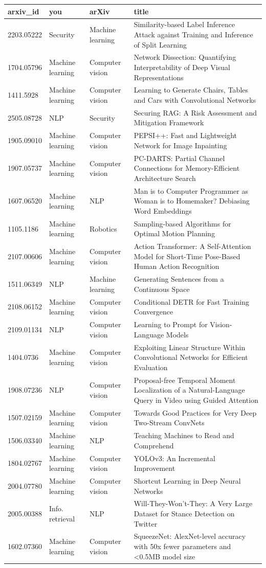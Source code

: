 \begin{tabular}{llll}
\toprule
arxiv\_id & you & arXiv & title \\
\midrule
2203.05222 & Security & Machine learning & Similarity-based Label Inference Attack against Training and Inference of Split Learning \\
1704.05796 & Machine learning & Computer vision & Network Dissection: Quantifying Interpretability of Deep Visual Representations \\
1411.5928 & Machine learning & Computer vision & Learning to Generate Chairs, Tables and Cars with Convolutional Networks \\
2505.08728 & NLP & Security & Securing RAG: A Risk Assessment and Mitigation Framework \\
1905.09010 & Machine learning & Computer vision & PEPSI++: Fast and Lightweight Network for Image Inpainting \\
1907.05737 & Machine learning & Computer vision & PC-DARTS: Partial Channel Connections for Memory-Efficient Architecture Search \\
1607.06520 & Machine learning & NLP & Man is to Computer Programmer as Woman is to Homemaker? Debiasing Word Embeddings \\
1105.1186 & Machine learning & Robotics & Sampling-based Algorithms for Optimal Motion Planning \\
2107.00606 & Machine learning & Computer vision & Action Transformer: A Self-Attention Model for Short-Time Pose-Based Human Action Recognition \\
1511.06349 & NLP & Machine learning & Generating Sentences from a Continuous Space \\
2108.06152 & Machine learning & Computer vision & Conditional DETR for Fast Training Convergence \\
2109.01134 & NLP & Computer vision & Learning to Prompt for Vision-Language Models \\
1404.0736 & Machine learning & Computer vision & Exploiting Linear Structure Within Convolutional Networks for Efficient Evaluation \\
1908.07236 & NLP & Computer vision & Proposal-free Temporal Moment Localization of a Natural-Language Query in Video using Guided Attention \\
1507.02159 & Machine learning & Computer vision & Towards Good Practices for Very Deep Two-Stream ConvNets \\
1506.03340 & Machine learning & NLP & Teaching Machines to Read and Comprehend \\
1804.02767 & Machine learning & Computer vision & YOLOv3: An Incremental Improvement \\
2004.07780 & Machine learning & Computer vision & Shortcut Learning in Deep Neural Networks \\
2005.00388 & Info. retrieval & NLP & Will-They-Won't-They: A Very Large Dataset for Stance Detection on Twitter \\
1602.07360 & Machine learning & Computer vision & SqueezeNet: AlexNet-level accuracy with 50x fewer parameters and <0.5MB model size \\
\bottomrule
\end{tabular}
